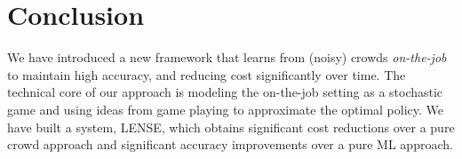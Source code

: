 \section{Conclusion}
\label{sec:conclusion}

We have introduced a new framework that learns from (noisy) crowds \emph{on-the-job}
to maintain high accuracy, and reducing cost significantly over time.
The technical core of our approach is modeling the on-the-job setting
as a stochastic game and using ideas from game playing to approximate the optimal policy.
We have built a system, LENSE, %
which obtains significant cost reductions over a pure crowd approach
and significant accuracy improvements over a pure ML approach.

